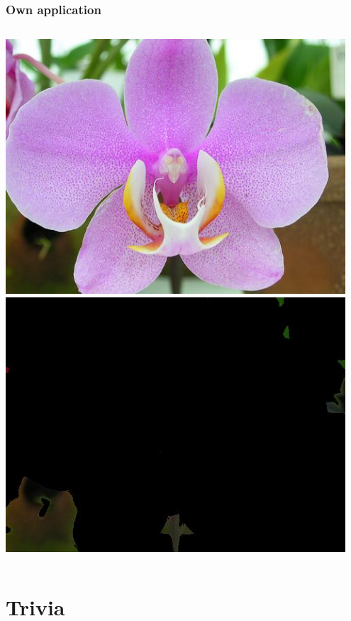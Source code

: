 \documentclass{beamer}
\begin{document}
\begin{frame}
    \frametitle{Own application}
    \begin{columns}
            \centering
            \includegraphics[width=0.95\textwidth]{report-images/3555690726_4d876d7195.jpg}
            \centering
            \includegraphics[width=0.95\textwidth]{report-images/thresh_3555690726_4d876d7195.jpg}
    \end{columns}
\end{frame}


\section{Trivia}
\end{document}
